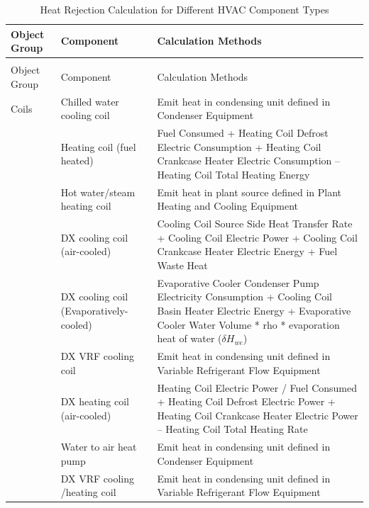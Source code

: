\begin{longtable}[c]{p{1.0in}p{2.0in}p{3in}}
\caption{Heat Rejection Calculation for Different HVAC Component Types \label{table:emission-from-hvac-components}} \tabularnewline
\toprule
Object Group & Component & Calculation Methods \tabularnewline
\midrule
\endfirsthead
\caption{Heat Rejection Calculation for Different HVAC Component Types} \tabularnewline
\toprule
Object Group & Component & Calculation Methods \tabularnewline
\midrule
\endhead
Coils      & Chilled water cooling coil   & Emit heat in condensing unit defined in Condenser Equipment \tabularnewline
           & Heating coil (fuel heated)   & Fuel Consumed + Heating Coil Defrost Electric Consumption + Heating Coil Crankcase Heater Electric Consumption – Heating Coil Total Heating Energy \tabularnewline
           & Hot water/steam heating coil & Emit heat in plant source defined in Plant Heating and Cooling Equipment \tabularnewline
           & DX cooling coil (air-cooled) & Cooling Coil Source Side Heat Transfer Rate + Cooling Coil Electric Power + Cooling Coil Crankcase Heater Electric Energy + Fuel Waste Heat \tabularnewline
           & DX cooling coil (Evaporatively-cooled)  & Evaporative Cooler Condenser Pump Electricity Consumption + Cooling Coil Basin Heater Electric Energy + Evaporative Cooler Water Volume * rho * evaporation heat of water (\(\delta H_{we}\)) \tabularnewline
           & DX VRF cooling coil          & Emit heat in condensing unit defined in Variable Refrigerant Flow Equipment \tabularnewline
           & DX heating coil (air-cooled) & Heating Coil Electric Power / Fuel Consumed + Heating Coil Defrost Electric Power + Heating Coil Crankcase Heater Electric Power – Heating Coil Total Heating Rate \tabularnewline
           & Water to air heat pump       & Emit heat in condensing unit defined in Condenser Equipment \tabularnewline
           & DX VRF cooling /heating coil & Emit heat in condensing unit defined in Variable Refrigerant Flow Equipment \tabularnewline


\end{longtable}
